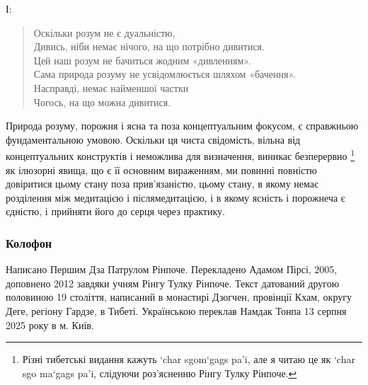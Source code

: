 \documentclass{article}
\begin{document}
І:

\begin{verse}
        Оскільки розум не є дуальністю, \\
        Дивись, ніби немає нічого, на що потрібно дивитися. \\
        Цей наш розум не бачиться жодним «дивленням». \\
        Сама природа розуму не усвідомлюється шляхом «бачення». \\
        Насправді, немає найменшої частки \\
        Чогось, на що можна дивитися.
\end{verse}

Природа розуму, порожня і ясна та поза концептуальним фокусом,
є справжньою фундаментальною умовою. Оскільки ця чиста свідомість,
вільна від концептуальних конструктів і неможлива для визначення,
виникає безперервно \footnote{Різні тибетські видання кажуть ‘char sgom‘gags pa’i, але я читаю це як ‘char sgo ma‘gags pa’i, слідуючи роз’ясненню Рінгу Тулку Рінпоче.} як ілюзорні явища, що є її основним вираженням,
ми повинні повністю довіритися цьому стану поза прив’язаністю,
цьому стану, в якому немає розділення між медитацією і післямедитацією,
і в якому ясність і порожнеча є єдністю, і прийняти його до серця через практику.

\vspace{1cm}

\subsubsection*{Колофон}
\footnotesize
Написано Першим Дза Патрулом Рінпоче. Перекладено Адамом Пірсі, 2005, доповнено 2012 завдяки учням Рінгу Тулку Рінпоче.
Текст датований другою половиною 19 століття, написаний в монастирі Дзогчен, провінції Кхам, округу Деге, регіону Гардзе, в Тибеті.
Українською переклав Намдак Тонпа 13 серпня 2025 року в м. Київ.

\end{document}
